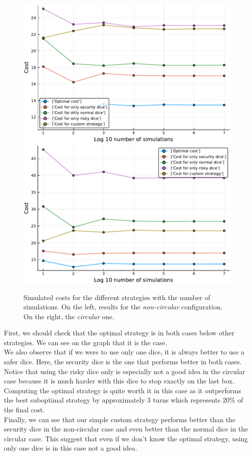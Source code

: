 \begin{figure}[H]
\centering
\includegraphics[scale=0.53]{../img/board_unif_low/cost_subopt_log_noncirc.pdf}
\includegraphics[scale=0.53]{../img/board_unif_low/cost_subopt_log_circ.pdf}
\caption{Simulated costs for the different strategies with the number of simulations. On the left, results for the \emph{non-circular} configuration. On the right, the \emph{circular} one.}
\label{fig:cost_subopt_log}
\end{figure}

First, we should check that the optimal strategy is in both cases below other strategies. 
We can see on the graph that it is the case. \\
We also observe that if we were to use only one dice, it is always better to use a safer dice. 
Here, the security dice is the one that performs better in both cases. 
Notice that using the risky dice only is especially not a good idea in the circular case because it is much harder with this dice to stop exactly on the last box. \\
Computing the optimal strategy is quite worth it in this case as it outperforms the best suboptimal strategy by approximately 3 turns which represents 20\% of the final cost. \\
Finally, we can see that our simple custom strategy performs better than the security dice in the non-circular case and even better than the normal dice in the circular case. 
This suggest that even if we don't know the optimal strategy, using only one dice is in this case not a good idea.  
